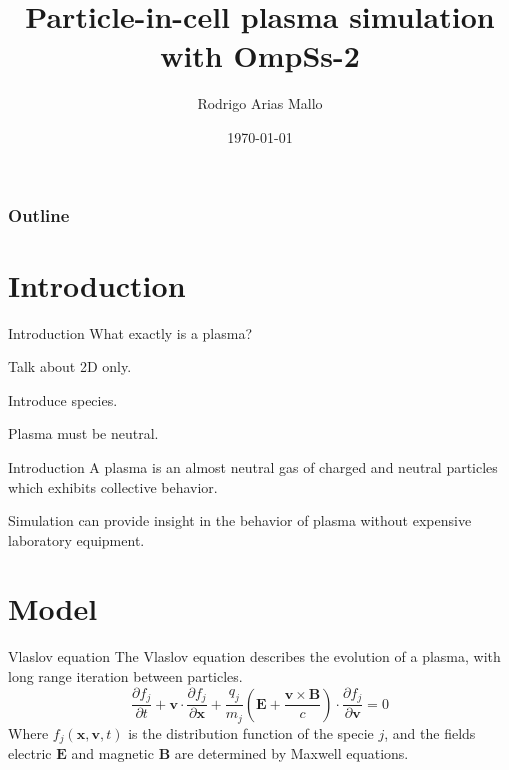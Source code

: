 \documentclass{beamer}
\title{Particle-in-cell plasma simulation with OmpSs-2}
\author{Rodrigo Arias Mallo}
\date{\today}
\newcommand*\V[1]{\bm{#1}}
\newcommand{\E}{\V{E}}
\newcommand{\B}{\V{B}}
\renewcommand*{\v}{\V{v}}
\newcommand{\x}{\V{x}}
\begin{document}
\frame{\titlepage}

\begin{frame}
\frametitle{Outline}
\tableofcontents
\end{frame}

\section{Introduction}

\begin{frame}{Introduction}
What exactly is a plasma?

Talk about 2D only.

Introduce species.

Plasma must be neutral.

\end{frame}

\begin{frame}{Introduction}
A plasma is an almost neutral gas of charged and neutral particles which 
exhibits collective behavior.

\vspace{1em}
Simulation can provide insight in the behavior of plasma without expensive 
laboratory equipment.
\end{frame}

\section{Model}

\begin{frame}{Vlaslov equation}
The Vlaslov equation describes the evolution of a plasma, with long range 
iteration between particles.
\begin{equation}%
\frac {\partial f_j}{\partial t} +
\v \cdot \frac {\partial f_j}{\partial \V x } +
\frac{q_j}{m_j} \left( \E + \frac{\v \times \B}{c} \right) \cdot
	\frac {\partial f_j}{\partial \V v}
=0
\end{equation}%
Where $f_j(\x,\v,t)$ is the distribution function of the specie $j$, and the 
fields electric $\E$ and magnetic $\B$ are determined by Maxwell equations.
\end{frame}
\end{document}

